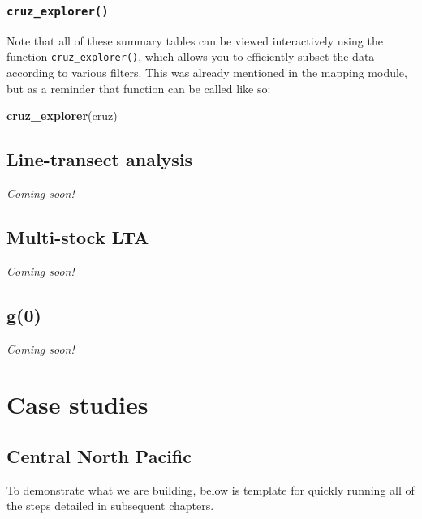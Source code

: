 \documentclass[
]{book}
\newenvironment{Shaded}{\begin{snugshade}}{\end{snugshade}}
\newcommand{\KeywordTok}[1]{\textcolor[rgb]{0.13,0.29,0.53}{\textbf{#1}}}
\newcommand{\NormalTok}[1]{#1}
\begin{document}
\hypertarget{cruz_explorer}{%
\section*{\texorpdfstring{\texttt{cruz\_explorer()}}{cruz\_explorer()}}\label{cruz_explorer}}

Note that all of these summary tables can be viewed interactively using the function \texttt{cruz\_explorer()},
which allows you to efficiently subset the data according to various filters. This was already mentioned in the mapping module, but as a reminder that function can be called like so:

\begin{Shaded}
\begin{Highlighting}[]
\KeywordTok{cruz_explorer}\NormalTok{(cruz)}
\end{Highlighting}
\end{Shaded}

\hypertarget{lta}{%
\chapter{Line-transect analysis}\label{lta}}

\emph{Coming soon!}

\hypertarget{multistock}{%
\chapter{Multi-stock LTA}\label{multistock}}

\emph{Coming soon!}

\hypertarget{g0}{%
\chapter{g(0)}\label{g0}}

\emph{Coming soon!}

\hypertarget{part-case-studies}{%
\part{Case studies}\label{part-case-studies}}

\hypertarget{casestudies}{%
\chapter{Central North Pacific}\label{casestudies}}

To demonstrate what we are building, below is template for quickly running all of the steps detailed in subsequent chapters.
\end{document}
